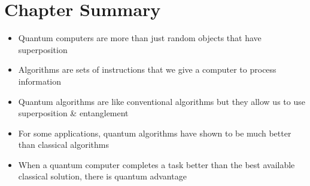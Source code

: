 \section{Chapter Summary}
\begin{itemize}
    \item Quantum computers are more than just random objects that have superposition
    \item Algorithms are sets of instructions that we give a computer to process information 
    \item Quantum algorithms are like conventional algorithms but they allow us to use superposition \& entanglement 
    \item For some applications, quantum algorithms have shown to be much better than classical algorithms
    \item When a quantum computer completes a task better than the best available classical solution, there is quantum advantage
\end{itemize}